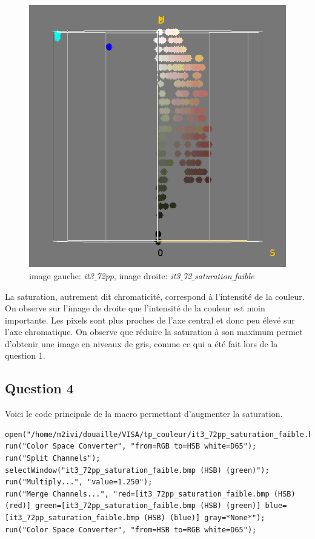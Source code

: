 \documentclass[a4paper,12pt]{report}
\begin{document}
\begin{figure}[!ht]
	\includegraphics[scale=0.4]{image/E2q2-2.png}
	\caption{image gauche: \textit{it3$\_$72pp}, image droite: \textit{it3$\_$72$\_$saturation$\_$faible}}
\end{figure} 

La saturation, autrement dit chromaticité, correspond à l'intensité de la couleur. On observe sur l'image de droite que l'intensité de la couleur est moin importante. Les pixels sont plus proches de l'axe central et donc peu élevé sur l'axe chromatique. On observe que réduire la saturation à son maximum permet d'obtenir une image en niveaux de gris, comme ce qui a été fait lors de la question 1.

\newpage

\subsection*{Question 4}

Voici le code principale de la macro permettant d'augmenter la saturation.
\begin{lstlisting}[style=Java,caption={Code question 4},label=lst:question 4]
open("/home/m2ivi/douaille/VISA/tp_couleur/it3_72pp_saturation_faible.bmp");
run("Color Space Converter", "from=RGB to=HSB white=D65");
run("Split Channels");
selectWindow("it3_72pp_saturation_faible.bmp (HSB) (green)");
run("Multiply...", "value=1.250");
run("Merge Channels...", "red=[it3_72pp_saturation_faible.bmp (HSB) (red)] green=[it3_72pp_saturation_faible.bmp (HSB) (green)] blue=[it3_72pp_saturation_faible.bmp (HSB) (blue)] gray=*None*");
run("Color Space Converter", "from=HSB to=RGB white=D65");
\end{lstlisting}
\end{document}
